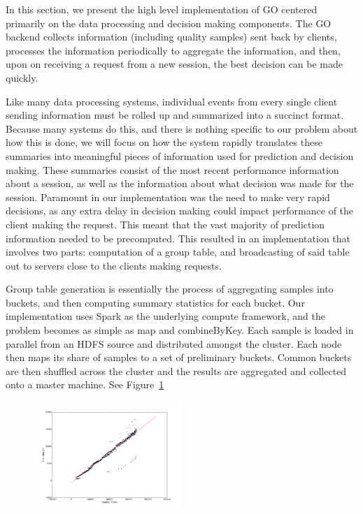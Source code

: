 In this section, we present the high level implementation of GO centered primarily on the data processing and decision making components. The GO backend collects information (including quality samples) sent back by clients, processes the information periodically to aggregate the information, and then, upon on receiving a request from a new session, the best decision can be made quickly.

Like many data processing systems, individual events from every single client sending information must be rolled up and summarized into a succinct format. Because many systems do this, and there is nothing specific to our problem about how this is done, we will focus on how the system rapidly translates these summaries into meaningful pieces of information used for prediction and decision making. These summaries consist of the most recent performance information about a session, as well as the information about what decision was made for the session. Paramount in our implementation was the need to make very rapid decisions, as any extra delay in decision making could impact performance of the client making the request. This meant that the vast majority of prediction information needed to be precomputed. This resulted in an implementation that involves two parts: computation of a group table, and broadcasting of said table out to servers close to the clients making requests.

 Group table generation is essentially the process of aggregating samples into buckets, and then computing summary statistics for each bucket.  Our implementation uses Spark as the underlying compute framework, and the problem becomes as simple as map and combineByKey. Each sample is loaded in parallel from an HDFS source and distributed amongst the cluster. Each node then maps its share of samples to a set of preliminary buckets. Common buckets are then shuffled across the cluster and the results are aggregated and collected onto a master machine. See Figure~\ref{fig:computing-scale}

\begin{figure}[h!]
\centering
 \includegraphics[width=0.5\textwidth] {figures/scale/fetch_time_scale.pdf}
\label{fig:computing-scale}
\end{figure}

